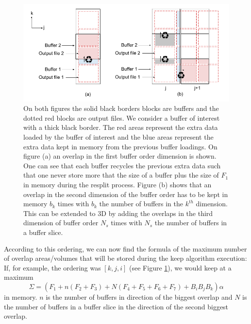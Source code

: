 \documentclass[conference]{IEEEtran}
\begin{document}
\begin{figure}[h]
\centering
\includegraphics[scale=0.45]{./figures/new/naive_buffer_order.png}
\caption{On both figures the solid black borders blocks are buffers and the dotted red blocks are output files. We consider a buffer of interest with a thick black border. The red areas represent the extra data loaded by the buffer of interest and the blue areas represent the extra data kept in memory from the previous buffer loadings. On figure (a) an overlap in the first buffer order dimension is shown. One can see that each buffer recycles the previous extra data such that one never store more that the size of a buffer plus the size of $F_1$ in memory during the resplit process. Figure (b) shows that an overlap in the second dimension of the buffer order has to be kept in memory $b_k$ times with $b_k$ the number of buffers in the $k^{th}$ dimension. This can be extended to 3D by adding the overlaps in the third dimension of buffer order $N_s$ times with $N_s$ the number of buffers in a buffer slice.
}
\label{fig:naive_buffer_order}
\end{figure}

According to this ordering, we can now find the formula of the maximum number of overlap areas/volumes that will be stored during the keep algorithm execution:
If, for example, the ordering was $[k,j,i]$ (see Figure \ref{fig:naive_buffer_order}), we would keep at a maximum
\begin{equation} \label{eq:1}
\Sigma = (F_1 + n(F_2 + F_3) + N(F_4 + F_5 + F_6 + F_7) + B_iB_jB_k)\alpha
\end{equation}
in memory.
$n$ is the number of buffers in direction of the biggest overlap and $N$ is the number of buffers in a buffer slice in the direction of the second biggest overlap.
\end{document}
